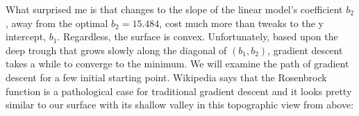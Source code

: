 \documentclass[titlepage]{tufte-book}
\begin{document}
\begin{fullwidth}
\noindent {}

What surprised me is that changes to the slope of the linear model's coefficient $b_2$, away from the optimal $b_2=15.484$, cost much more than tweaks to the y intercept, $b_1$. Regardless, the surface is convex. Unfortunately, based upon the deep trough that grows slowly along the diagonal of $(b_1,b_2)$, gradient descent takes a while to converge to the minimum. We will examine the path of gradient descent for a few initial starting point. Wikipedia says that the Rosenbrock function is a pathological case for traditional gradient descent and it looks pretty similar to our surface with its shallow valley in this topographic view from above:


\end{fullwidth}
\end{document}
